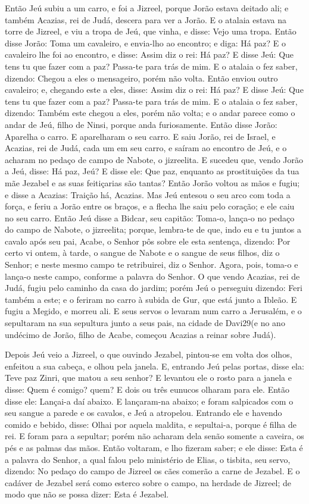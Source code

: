 Então Jeú subiu a um carro, e foi a Jizreel, porque Jorão estava
deitado ali; e também Acazias, rei de Judá, descera para ver a
Jorão. E o atalaia estava na torre de Jizreel, e viu a tropa
de Jeú, que vinha, e disse: Vejo uma tropa. Então disse Jorão: Toma
um cavaleiro, e envia-lho ao encontro; e diga: Há paz? E o
cavaleiro lhe foi ao encontro, e disse: Assim diz o rei: Há paz? E
disse Jeú: Que tens tu que fazer com a paz? Passa-te para trás de
mim. E o atalaia o fez saber, dizendo: Chegou a eles o mensageiro,
porém não volta. Então enviou outro cavaleiro; e, chegando
este a eles, disse: Assim diz o rei: Há paz? E disse Jeú: Que tens
tu que fazer com a paz? Passa-te para trás de mim. E o
atalaia o fez saber, dizendo: Também este chegou a eles, porém não
volta; e o andar parece como o andar de Jeú, filho de Ninsi, porque
anda furiosamente. Então disse Jorão: Aparelha o carro. E
aparelharam o seu carro. E saiu Jorão, rei de Israel, e Acazias, rei
de Judá, cada um em seu carro, e saíram ao encontro de Jeú, e o
acharam no pedaço de campo de Nabote, o jizreelita. E sucedeu
que, vendo Jorão a Jeú, disse: Há paz, Jeú? E disse ele: Que paz,
enquanto as prostituições da tua mãe Jezabel e as suas feitiçarias
são tantas? Então Jorão voltou as mãos e fugiu; e disse a
Acazias: Traição há, Acazias. Mas Jeú entesou o seu arco com
toda a força, e feriu a Jorão entre os braços, e a flecha lhe saiu
pelo coração; e ele caiu no seu carro. Então Jeú disse a
Bidcar, seu capitão: Toma-o, lança-o no pedaço do campo de Nabote, o
jizreelita; porque, lembra-te de que, indo eu e tu juntos a cavalo
após seu pai, Acabe, o Senhor pôs sobre ele esta sentença, dizendo:
Por certo vi ontem, à tarde, o sangue de Nabote e o sangue de
seus filhos, diz o Senhor; e neste mesmo campo te retribuirei, diz o
Senhor. Agora, pois, toma-o e lança-o neste campo, conforme a
palavra do Senhor. O que vendo Acazias, rei de Judá, fugiu
pelo caminho da casa do jardim; porém Jeú o perseguiu dizendo: Feri
também a este; e o feriram no carro à subida de Gur, que está junto
a Ibleão. E fugiu a Megido, e morreu ali. E seus servos o
levaram num carro a Jerusalém, e o sepultaram na sua sepultura junto
a seus pais, na cidade de Davi29(e no ano undécimo de Jorão, filho
de Acabe, começou Acazias a reinar sobre Judá).

Depois Jeú veio a Jizreel, o que ouvindo Jezabel, pintou-se em
volta dos olhos, enfeitou a sua cabeça, e olhou pela janela.
E, entrando Jeú pelas portas, disse ela: Teve paz Zinri, que
matou a seu senhor? E levantou ele o rosto para a janela e
disse: Quem é comigo? quem? E dois ou três eunucos olharam para ele.
Então disse ele: Lançai-a daí abaixo. E lançaram-na abaixo; e
foram salpicados com o seu sangue a parede e os cavalos, e Jeú a
atropelou. Entrando ele e havendo comido e bebido, disse:
Olhai por aquela maldita, e sepultai-a, porque é filha de rei.
E foram para a sepultar; porém não acharam dela senão somente
a caveira, os pés e as palmas das mãos. Então voltaram, e lho
fizeram saber; e ele disse: Esta é a palavra do Senhor, a qual falou
pelo ministério de Elias, o tisbita, seu servo, dizendo: No pedaço
do campo de Jizreel os cães comerão a carne de Jezabel. E o
cadáver de Jezabel será como esterco sobre o campo, na herdade de
Jizreel; de modo que não se possa dizer: Esta é Jezabel.

